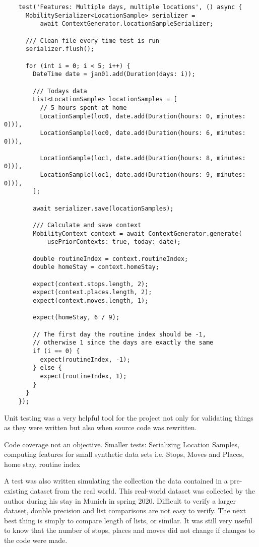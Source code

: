 \begin{verbatim}
    test('Features: Multiple days, multiple locations', () async {
      MobilitySerializer<LocationSample> serializer =
          await ContextGenerator.locationSampleSerializer;

      /// Clean file every time test is run
      serializer.flush();

      for (int i = 0; i < 5; i++) {
        DateTime date = jan01.add(Duration(days: i));

        /// Todays data
        List<LocationSample> locationSamples = [
          // 5 hours spent at home
          LocationSample(loc0, date.add(Duration(hours: 0, minutes: 0))),
          LocationSample(loc0, date.add(Duration(hours: 6, minutes: 0))),

          LocationSample(loc1, date.add(Duration(hours: 8, minutes: 0))),
          LocationSample(loc1, date.add(Duration(hours: 9, minutes: 0))),
        ];

        await serializer.save(locationSamples);

        /// Calculate and save context
        MobilityContext context = await ContextGenerator.generate(
            usePriorContexts: true, today: date);

        double routineIndex = context.routineIndex;
        double homeStay = context.homeStay;

        expect(context.stops.length, 2);
        expect(context.places.length, 2);
        expect(context.moves.length, 1);

        expect(homeStay, 6 / 9);

        // The first day the routine index should be -1,
        // otherwise 1 since the days are exactly the same
        if (i == 0) {
          expect(routineIndex, -1);
        } else {
          expect(routineIndex, 1);
        }
      }
    });
\end{verbatim}

Unit testing was a very helpful tool for the project not only for validating things as they were written but also when source code was rewritten.

Code coverage not an objective.
Smaller tests:
Serializing Location Samples, computing features for small synthetic data sets i.e. Stops, Moves and Places, home stay, routine index

A test was also written simulating the collection the data contained in a pre-existing dataset from the real world. This real-world dataset was collected by the author during his stay in Munich in spring 2020. 
Difficult to verify a larger dataset, double precision and list comparisons are not easy to verify. The next best thing is simply to compare length of lists, or similar. It was still very useful to know that the number of stops, places and moves did not change if changes to the code were made.

